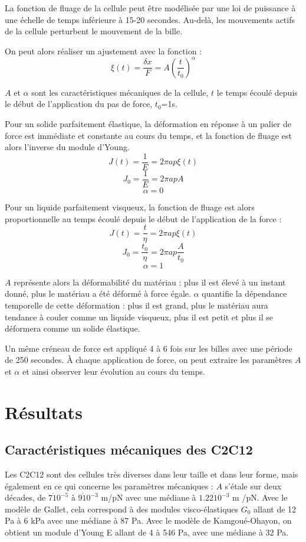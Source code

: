 	 
La fonction de fluage de la cellule peut être modélisée par une loi de puissance à une échelle de temps inférieure à 15-20 secondes. Au-delà, les mouvements actifs de la cellule perturbent le mouvement de la bille. 

On peut alors réaliser un ajustement avec la fonction : 
$$ \xi (t) = \frac{\delta x}{F}=A \left( \frac{t}{t_0} \right)^{\alpha}$$

$A$ et $\alpha$ sont les caractéristiques mécaniques de la cellule, $t$ le temps écoulé depuis le début de l'application du pas de force, $t_0$=1s. 

Pour un solide parfaitement élastique, la déformation en réponse à un palier de force est immédiate et constante au cours du temps, et la fonction de fluage est alors l'inverse du module d'Young.
$$J(t)=\frac{1}{E} = 2 \pi a p \xi(t)$$
 $$J_0=\frac{1}{E} = 2 \pi a p A$$
 $$\alpha=0$$
 
 Pour un liquide parfaitement visqueux, la fonction de fluage est alors  proportionnelle au temps écoulé depuis le début de l'application de la force : 
 $$ J(t)=\frac{t}{\eta} = 2 \pi a p \xi(t)$$
 $$J_0=\frac{t_0}{\eta} = 2 \pi a p \frac{A}{t_0}$$
 $$\alpha=1$$
 
 $A$ représente alors la déformabilité du matériau : plus il est élevé à un instant donné, plus le matériau a été déformé à force égale. 
 $\alpha$ quantifie la dépendance temporelle de cette déformation : plus il est grand, plus le matériau aura tendance à couler comme un liquide visqueux, plus il est petit et plus il se déformera comme un solide élastique. 

Un même créneau de force est appliqué 4 à 6 fois sur les billes avec une période de 250 secondes. 
À chaque application de force, on peut extraire les paramètres $A$ et $\alpha$ et ainsi observer leur évolution au cours du temps. 


\section{Résultats}



\subsection{Caractéristiques mécaniques des C2C12}

Les C2C12 sont des cellules très diverses dans leur taille et dans leur forme, mais également en ce qui concerne les paramètres mécaniques : $A$ s'étale sur deux décades, de $7\dot 10^{-5}$ à $9\dot 10^{-3}$ \micro m/pN avec une médiane à $1.22 \dot 10^{-3}$ \micro m /pN.  Avec le modèle de Gallet, cela correspond à des modules visco-élastiques $G_0$ allant de 12 Pa à 6 kPa avec une médiane à 87 Pa. 
Avec le modèle de Kamgoué-Ohayon, on obtient un module d'Young E allant de 4 à 546 Pa, avec une médiane à 32 Pa. 

